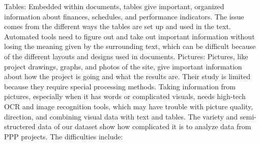 \vskip 0.5cm
Tables: Embedded within documents, tables give important, organized information about finances, schedules, and performance indicators. The issue comes from the different ways the tables are set up and used in the text. Automated tools need to figure out and take out important information without losing the meaning given by the surrounding text, which can be difficult because of the different layouts and designs used in documents.
\vskip 0.5cm
Pictures: Pictures, like project drawings, graphs, and photos of the site, give important information about how the project is going and what the results are. Their study is limited because they require special processing methods. Taking information from pictures, especially when it has words or complicated visuals, needs high-tech OCR and image recognition tools, which may have trouble with picture quality, direction, and combining visual data with text and tables.
\vskip 0.5cm
The variety and semi-structered data of our dataset show how complicated it is to analyze data from PPP projects. The difficulties include:
